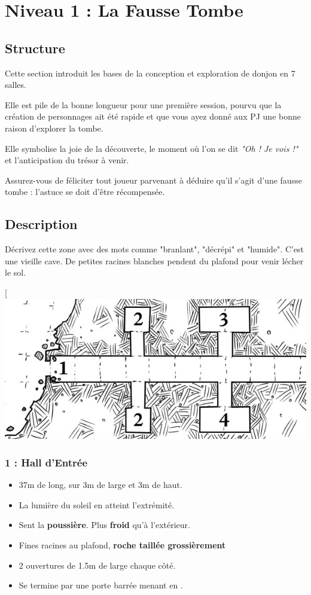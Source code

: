 \chapter{Niveau 1 : La Fausse Tombe}
\section{Structure}
Cette section introduit les bases de la conception et exploration de donjon en 7 salles.

Elle est pile de la bonne longueur pour une première session, pourvu que la création de personnages ait été rapide et que vous ayez donné aux PJ une bonne raison d'explorer la tombe.

Elle symbolise la joie de la découverte, le moment où l'on se dit \emph{"Oh ! Je vois !"} et l'anticipation du trésor à venir.

Assurez-vous de féliciter tout joueur parvenant à déduire qu'il s'agit d'une fausse tombe : l'astuce se doit d'être récompensée.

\newpage
\section{Description}
Décrivez cette zone avec des mots comme "branlant", "décrépi" et "humide".
C'est une vieille cave.
De petites racines blanches pendent du plafond pour venir lécher le sol.

\begin{center}[
  \includegraphics[width=\linewidth]{pics/map_1-4.jpg}
\end{center}

\subsection{1 : Hall d'Entrée}\label{n1:s1}
\begin{itemize}
  \item 37m de long, sur 3m de large et 3m de haut.
  \item La lumière du soleil en atteint l'extrémité.
  \item Sent la \textbf{poussière}. Plus \textbf{froid} qu'à l'extérieur.
  \item Fines racines au plafond, \textbf{roche taillée grossièrement}
  \item 2 ouvertures de 1.5m de large chaque côté.
  \item Se termine par une porte barrée menant en \textbf{}.
\end{itemize}

